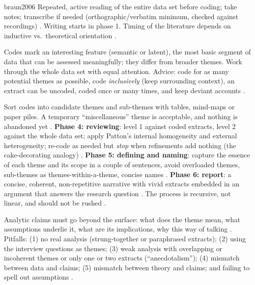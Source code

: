 \begin{papercard}{braun2006}
 Repeated, active reading of the entire data set before coding; take notes; transcribe if needed (orthographic/verbatim minimum, checked against recordings) . Writing starts in phase 1. Timing of the literature depends on inductive vs.\ theoretical orientation .

 Codes mark an interesting feature (semantic or latent), the most basic segment of data that can be assessed meaningfully; they differ from broader themes. Work through the whole data set with equal attention. Advice: code for as many potential themes as possible, code \emph{inclusively} (keep surrounding context), an extract can be uncoded, coded once or many times, and keep deviant accounts .

 Sort codes into candidate themes and sub-themes with tables, mind-maps or paper piles. A temporary ``miscellaneous'' theme is acceptable, and nothing is abandoned yet . \textbf{Phase 4: reviewing}: level 1 against coded extracts, level 2 against the whole data set; apply Patton's internal homogeneity and external heterogeneity; re-code as needed but \emph{stop} when refinements add nothing (the cake-decorating analogy) . \textbf{Phase 5: defining and naming}: capture the essence of each theme and its scope in a couple of sentences, avoid overloaded themes, sub-themes as themes-within-a-theme, concise names . \textbf{Phase 6: report}: a concise, coherent, non-repetitive narrative with vivid extracts embedded in an argument that answers the research question . The process is recursive, not linear, and should not be rushed .

 Analytic claims must go beyond the surface: what does the theme mean, what assumptions underlie it, what are its implications, why this way of talking . Pitfalls: (1) no real analysis (strung-together or paraphrased extracts); (2) using the interview questions as themes; (3) weak analysis with overlapping or incoherent themes or only one or two extracts (``anecdotalism''); (4) mismatch between data and claims; (5) mismatch between theory and claims; and failing to spell out assumptions .


\end{papercard}
